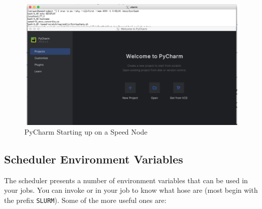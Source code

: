 \begin{figure}[htpb]
	\includegraphics[width=\columnwidth]{images/pycharm}
    \caption{PyCharm Starting up on a Speed Node}
	\label{fig:pycharm}
\end{figure}


\subsection{Scheduler Environment Variables}
\label{sect:env-vars}

The scheduler presents a number of environment variables that can be used in 
your jobs. You can invoke  or  in your
job to know what hose are (most begin with the prefix \texttt{SLURM}).
%
Some of the more useful ones are:

